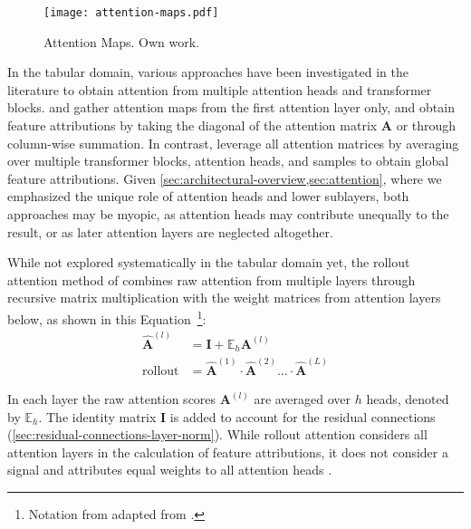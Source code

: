 \begin{figure}[ht]
    \centering
    \texttt{[image: attention-maps.pdf]}
    \caption[Attention Maps]{Attention Maps. Own work.}
    \label{fig:attention-maps}
\end{figure}

In the tabular domain, various approaches have been investigated in the literature to obtain attention from multiple attention heads and transformer blocks. \textcite[][18]{somepalliSAINTImprovedNeural2021} and \textcite[][11]{borisovDeepNeuralNetworks2022} gather attention maps from the first attention layer only, and \textcite[][11]{borisovDeepNeuralNetworks2022} obtain feature attributions by taking the diagonal of the attention matrix $\boldsymbol{A}$ or through column-wise summation. In contrast, \textcite[][10]{gorishniyRevisitingDeepLearning2021} leverage all attention matrices by averaging over multiple transformer blocks, attention heads, and samples to obtain global feature attributions. Given \cref{sec:architectural-overview,sec:attention}, where we emphasized the unique role of attention heads and lower sublayers, both approaches may be myopic, as attention heads may contribute unequally to the result, or as later attention layers are neglected altogether.

While not explored systematically in the tabular domain yet, the rollout attention method of \textcite[][3]{abnarQuantifyingAttentionFlow2020} combines raw attention from multiple layers through recursive matrix multiplication with the weight matrices from attention layers below, as shown in this Equation~\footnote{Notation from adapted from \textcite[][786]{cheferTransformerInterpretabilityAttention2021}.}:
\begin{equation}
    \begin{aligned}
        \hat{\boldsymbol{A}}^{(l)} & =\boldsymbol{I}+\mathbb{E}_h \boldsymbol{A}^{(l)}                                                  \\
        \operatorname { rollout }  & =\hat{\boldsymbol{A}}^{(1)} \cdot \hat{\boldsymbol{A}}^{(2)} \ldots\cdot\hat{\boldsymbol{A}}^{(L)}
    \end{aligned}
    \label{eq:attention-map-rollout}
\end{equation}

In each layer the raw attention scores $\boldsymbol{A}^{(l)}$ are averaged over $h$ heads, denoted by $\mathbb{E}_h$. The identity matrix $\boldsymbol{I}$ is added to account for the residual connections (\cref{sec:residual-connections-layer-norm}). While rollout attention considers all attention layers in the calculation of feature attributions, it does not consider a signal and attributes equal weights to all attention heads \autocite[][786]{cheferTransformerInterpretabilityAttention2021}.

